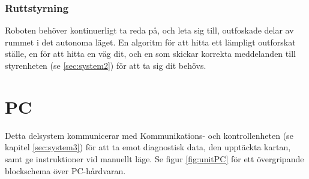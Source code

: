 \documentclass[a4paper,11pt]{article}
\begin{document}
\subsubsection{Ruttstyrning}
Roboten behöver kontinuerligt ta reda på, och leta sig till, outfoskade delar av rummet i det autonoma läget. En algoritm för att hitta ett lämpligt outforskat ställe, en för att hitta en väg dit, och en som skickar korrekta meddelanden till styrenheten (se \ref{sec:system2}) för att ta sig dit behövs.

%
%
%

\newpage
\section{PC} \label{sec:system4}
Detta delsystem kommunicerar med Kommunikations- och kontrollenheten (se kapitel \ref{sec:system3}) för att ta emot diagnostisk data, den upptäckta kartan, samt ge instruktioner vid manuellt läge. Se figur \ref{fig:unitPC} för ett övergripande blockschema över PC-hårdvaran.
\end{document}
